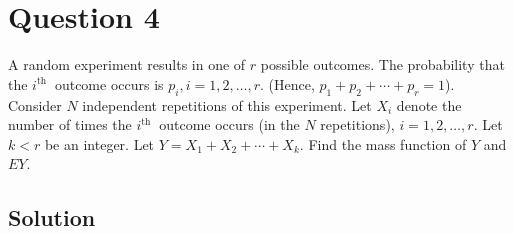 \section*{Question 4}

A random experiment results in one of \( r \) possible outcomes.
The probability that the \( i^{\text {th }} \) outcome occurs is \( p_{i}, i=1,2, \dots, r \).
(Hence, \( p_{1}+p_{2}+\cdots+p_{r}=1 \)).
Consider \( N \) independent repetitions of this experiment.
Let \( X_{i} \) denote the number of times the \( i^{\text {th }} \) outcome occurs (in the \( N \) repetitions), \( i=1,2, \dots, r \).
Let \( k<r \) be an integer.
Let \( Y=X_{1}+X_{2}+\cdots+X_{k} \).
Find the mass function of \( Y \) and \( E Y \).

\subsection*{Solution}
